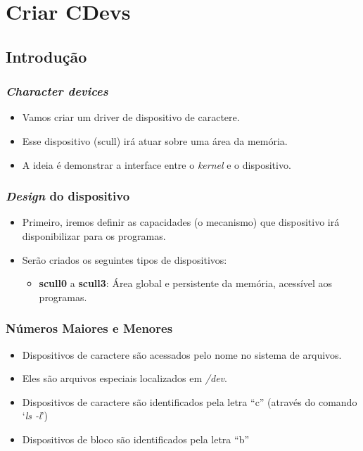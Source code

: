 \section{Criar CDevs} %

\subsection*{Introdução} %


\begin{frame}
	\frametitle{\textit{Character devices}}
	\begin{itemize}
		\item<1-> Vamos criar um driver de dispositivo de caractere.
		\item<2-> Esse dispositivo (scull) irá atuar sobre uma área da memória.
		\item<3-> A ideia é demonstrar a interface entre o \textit{kernel} e o dispositivo.
	\end{itemize}
\end{frame}


\begin{frame}
	\frametitle{\textit{Design} do dispositivo}
	\begin{itemize}
		\item<1-> Primeiro, iremos definir as capacidades (o mecanismo) que dispositivo irá disponibilizar para os programas.
		\item<2-> Serão criados os seguintes tipos de dispositivos:
		\begin{itemize}
			\item<3-> \textbf{scull0} a \textbf{scull3}: Área global e persistente da memória, acessível aos programas.
		\end{itemize}
	\end{itemize}
\end{frame}


\begin{frame}
	\frametitle{Números Maiores e Menores}
	\begin{itemize}
		\item<1-> Dispositivos de caractere são acessados pelo nome no sistema de arquivos.
		\item<2-> Eles são arquivos especiais localizados em \textit{/dev}.
		\item<3-> Dispositivos de caractere são identificados pela letra ``c'' (através do comando `\textit{ls -l}')
		\item<4-> Dispositivos de bloco são identificados pela letra ``b''
	\end{itemize}
\end{frame}



